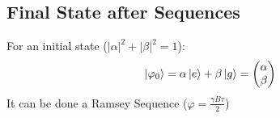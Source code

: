 \documentclass{article}
\begin{document}
\begin{center}
\begin{table}[h]
\end{table}
\end{center}


\subsection{Final State after Sequences}
For an initial state ($\lvert\alpha\rvert^2+\lvert\beta\rvert^2=1$):
\begin{equation}\label{eq27}\ket{\varphi_0}=\alpha\ket{e}+\beta\ket{g} =\begin{pmatrix}\alpha \\ \beta \end{pmatrix}\end{equation}
It can be done a Ramsey Sequence ($\varphi=\frac{\gamma B\tau}{2}$)
\end{document}
